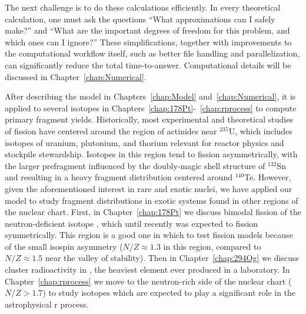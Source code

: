 
The next challenge is to do these calculations efficiently. In every theoretical calculation, one must ask the questions ``What approximations can I safely make?'' and ``What are the important degrees of freedom for this problem, and which ones can I ignore?'' These simplifications, together with improvements to the computational workflow itself, such as better file handling and parallelization, can significantly reduce the total time-to-answer. Computational details will be discussed in Chapter~\ref{chap:Numerical}.

After describing the model in Chapters~\ref{chap:Model} and~\ref{chap:Numerical}, it is applied to several isotopes in Chapters~\ref{chap:178Pt}-~\ref{chap:rprocess} to compute primary fragment yields. Historically, most experimental and theoretical studies of fission have centered around the region of actinides near $^{235}$U, which includes isotopes of uranium, plutonium, and thorium relevant for reactor physics and stockpile stewardship. Isotopes in this region tend to fission asymmetrically, with the larger prefragment influenced by the doubly-magic shell structure of $^{132}$Sn and resulting in a heavy fragment distribution centered around $^{140}$Te. However, given the aforementioned interest in rare and exotic nuclei, we have applied our model to study fragment distributions in exotic systems found in other regions of the nuclear chart. First, in Chapter~\ref{chap:178Pt} we discuss bimodal fission of the neutron-deficient isotope {\Pt}, which until recently was expected to fission symmetrically. This region is a good one in which to test fission models because of the small isospin asymmetry ($N/Z\approx1.3$ in this region, compared to $N/Z\approx1.5$ near the valley of stability). Then in Chapter~\ref{chap:294Og} we discuss cluster radioactivity in {\Og}, the heaviest element ever produced in a laboratory. In Chapter~\ref{chap:rprocess} we move to the neutron-rich side of the nuclear chart ($N/Z>1.7$) to study isotopes which are expected to play a significant role in the astrophysical r process. %

